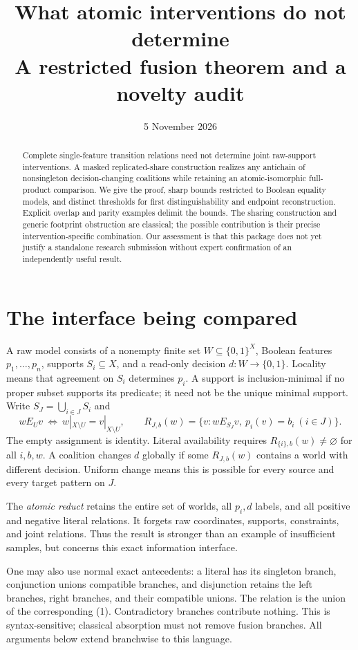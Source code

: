 \documentclass[11pt]{article}
\title{What atomic interventions do not determine\\[3pt]\large A restricted fusion theorem and a novelty audit}
\author{}
\date{5 November 2026}
\begin{document}
\maketitle
\vspace{-2em}
\begin{abstract}
Complete single-feature transition relations need not determine joint raw-support interventions. A masked replicated-share construction realizes any antichain of nonsingleton decision-changing coalitions while retaining an atomic-isomorphic full-product comparison. We give the proof, sharp bounds restricted to Boolean equality models, and distinct thresholds for first distinguishability and endpoint reconstruction. Explicit overlap and parity examples delimit the bounds. The sharing construction and generic footprint obstruction are classical; the possible contribution is their precise intervention-specific combination. Our assessment is that this package does not yet justify a standalone research submission without expert confirmation of an independently useful result.
\end{abstract}

\section{The interface being compared}
A raw model consists of a nonempty finite set $W\subseteq\{0,1\}^{X}$, Boolean features $p_1,\ldots,p_n$, supports $S_i\subseteq X$, and a read-only decision $d:W\to\{0,1\}$. Locality means that agreement on $S_i$ determines $p_i$. A support is inclusion-minimal if no proper subset supports its predicate; it need not be the unique minimal support. Write $S_J=\bigcup_{i\in J}S_i$ and
\[
 wE_Uv\ \Longleftrightarrow\ w|_{X\setminus U}=v|_{X\setminus U},\qquad
 R_{J,b}(w)=\{v:wE_{S_J}v,\ p_i(v)=b_i\ (i\in J)\}. \tag{1}
\]
The empty assignment is identity. Literal availability requires $R_{\{i\},b}(w)\ne\varnothing$ for all $i,b,w$. A coalition changes $d$ globally if some $R_{J,b}(w)$ contains a world with different decision. Uniform change means this is possible for every source and every target pattern on $J$.

The \emph{atomic reduct} retains the entire set of worlds, all $p_i,d$ labels, and all positive and negative literal relations. It forgets raw coordinates, supports, constraints, and joint relations. Thus the result is stronger than an example of insufficient samples, but concerns this exact information interface.

One may also use normal exact antecedents: a literal has its singleton branch, conjunction unions compatible branches, and disjunction retains the left branches, right branches, and their compatible unions. The relation is the union of the corresponding (1). Contradictory branches contribute nothing. This is syntax-sensitive; classical absorption must not remove fusion branches. All arguments below extend branchwise to this language.
\end{document}
